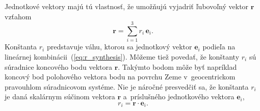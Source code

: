 \documentclass[a4paper,12pt]{book}
\let\vec\mathbf
\begin{document}
Jednotkové vektory majú tú vlastnosť, že umožňujú vyjadriť ľubovoľný vektor
$\vec r$ vzťahom
%
\begin{equation}
\label{eq:r_synthesis}
\vec r = \sum_{i = 1}^3 r_i \, \vec e_i{.}
\end{equation}
%
Konštanta $r_i$ predstavuje váhu, ktorou sa jednotkový vektor $\vec e_i$
podieľa na lineárnej kombinácii~(\ref{eq:r_synthesis}).  Môžeme tiež povedať,
že konštanty $r_i$ sú súradnice koncového bodu vektora $\vec r$.  Takýmto bodom
môže byť napríklad koncový bod polohového vektora bodu na povrchu Zeme
v~geocentrickom pravouhlom súradnicovom systéme.  Nie je náročné presvedčiť sa,
že konštanta $r_i$ je daná skalárnym súčinom vektora $\vec r$ a~príslušného
jednotkového vektora $\vec e_i$,
%
\begin{equation}
\label{eq:r_analysis}
r_i = \vec r \cdot \vec e_i{.}
\end{equation}
\end{document}

